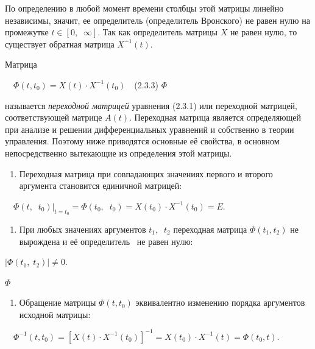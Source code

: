 		По определению в любой момент времени столбцы этой матрицы линейно независимы, значит, ее определитель (определитель
		Вронского) не равен нулю на промежутке  $t\in [0,\;\;\infty ]$. Так как определитель матрицы  $X$ не равен нулю, то
		существует обратная матрица  $X^{-1}(t)$.



		Матрица



		\ \  $\Phi (t,t_0)=X(t)\cdot X^{-1}(t_0)$\ \ (2.3.3)
$ \Phi $


		называется \textit{переходной матрицей} уравнения (2.3.1) или переходной матрицей, соответствующей матрице  $A(t)$.
		Переходная матрица является определяющей при анализе и решении дифференциальных уравнений и собственно в теории
		управления. Поэ­тому ниже приводятся основные её свойства, в основном непосредст­венно вытекающие из определения этой
		матрицы.


\liststyleWWviiiNumxxvii
\begin{enumerate}
	\item 
			Переходная матрица при совпадающих значениях первого и второго аргумента становится единичной матрицей:
	
\end{enumerate}

		\ \  $\Phi (t,\;\;t_0)|_{t=t_0}=\Phi (t_0,\;\;t_0)=X(t_0)\cdot X^{-1}(t_0)=E$.


\liststyleWWviiiNumxxvii
\setcounter{saveenum}{\value{enumi}}
\begin{enumerate}
	\setcounter{enumi}{\value{saveenum}}
	\item 
			При любых значениях аргументов  $t_1,\;\;t_2$ переходная матрица  $\Phi (t_1,t_2)$ не вырождена и её определитель \ не равен
			нулю:
	
\end{enumerate}

		   $|\Phi (t_1,\;t_2)|\neq 0$.

$ \Phi $
\liststyleWWviiiNumxxvii
\setcounter{saveenum}{\value{enumi}}
\begin{enumerate}
	\setcounter{enumi}{\value{saveenum}}
	\item 
			Обращение матрицы  $\Phi (t,t_0)$ эквивалентно изменению порядка аргументов исходной матрицы: 
	
\end{enumerate}

		\ \  $\Phi ^{-1}(t,t_0)=\left[X(t)\cdot X^{-1}(t_0)\right]^{-1}=X(t_0)\cdot X^{-1}(t)=\Phi (t_0,t)$.


